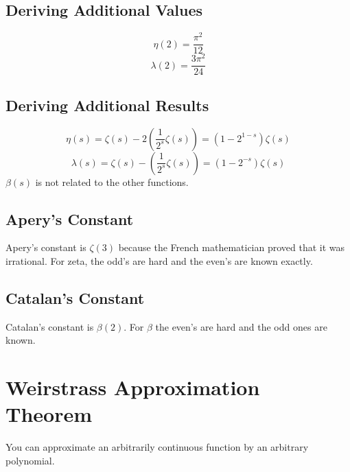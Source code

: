 \documentclass[../main.tex]{subfiles}
\begin{document}
    \subsection{Deriving Additional Values}
        $$\eta(2)=\frac{\pi^{2}}{12}$$
        $$\lambda(2)=\frac{3\pi^{2}}{24}$$

    \subsection{Deriving Additional Results}
        $$\eta(s)=\zeta(s)-2(\frac{1}{2^{s}}\zeta(s))=(1-2^{1-s})\zeta(s)$$
        $$\lambda(s)=\zeta(s)-(\frac{1}{2^{s}}\zeta(s))=(1-2^{-s})\zeta(s)$$
        $\beta(s)$ is not related to the other functions.

    \subsection{Apery's Constant}
        Apery's constant is $\zeta(3)$ because the French mathematician proved that 
        it was irrational. For zeta, the odd's are hard and the even's are known exactly.

    \subsection{Catalan's Constant}
        Catalan's constant is $\beta(2)$. For $\beta$ the even's are hard and the odd ones are known.
        
\section{Weirstrass Approximation Theorem}
    You can approximate an arbitrarily continuous function by an arbitrary polynomial.
\end{document}
